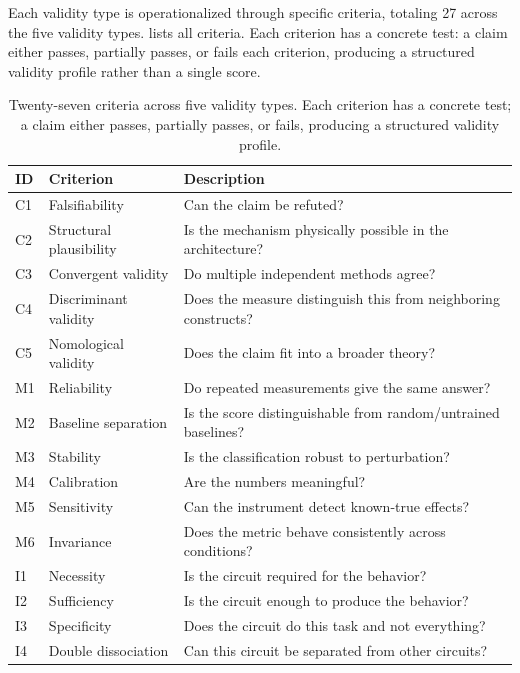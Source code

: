 \documentclass[10pt]{article}
\begin{document}
Each validity type is operationalized through specific criteria, totaling 27 across the five validity types.  lists all criteria. Each criterion has a concrete test: a claim either passes, partially passes, or fails each criterion, producing a structured validity profile rather than a single score.

\begingroup
{}
\begin{table}[H]
\centering
\small
\caption{Twenty-seven criteria across five validity types. Each criterion has a concrete test; a claim either passes, partially passes, or fails, producing a structured validity profile.}
\label{tab:criteria}
\renewcommand{\arraystretch}{1.15}
\begin{tabular}{@{}llp{8.5cm}@{}}
\toprule
\textbf{ID} & \textbf{Criterion} & \textbf{Description} \\
\midrule
C1 & Falsifiability & Can the claim be refuted? \\
C2 & Structural plausibility & Is the mechanism physically possible in the architecture? \\
C3 & Convergent validity & Do multiple independent methods agree? \\
C4 & Discriminant validity & Does the measure distinguish this from neighboring constructs? \\
C5 & Nomological validity & Does the claim fit into a broader theory? \\
\midrule
M1 & Reliability & Do repeated measurements give the same answer? \\
M2 & Baseline separation & Is the score distinguishable from random/untrained baselines? \\
M3 & Stability & Is the classification robust to perturbation? \\
M4 & Calibration & Are the numbers meaningful? \\
M5 & Sensitivity & Can the instrument detect known-true effects? \\
M6 & Invariance & Does the metric behave consistently across conditions? \\
\midrule
I1 & Necessity & Is the circuit required for the behavior? \\
I2 & Sufficiency & Is the circuit enough to produce the behavior? \\
I3 & Specificity & Does the circuit do this task and not everything? \\
I4 & Double dissociation & Can this circuit be separated from other circuits? \\

\end{tabular}
\end{table}
\end{document}
